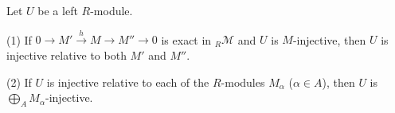 Let $U$ be a left $R$-module.

(1) If $0 \to M' \xrightarrow{h} M \to M'' \to 0$ is exact in ${}_R\mathcal{M}$ and $U$ is $M$-injective, then $U$ is injective relative to both $M'$ and $M''$.

(2) If $U$ is injective relative to each of the $R$-modules $M_\alpha$ ($\alpha \in A$), then $U$ is $\bigoplus_A M_\alpha$-injective.
